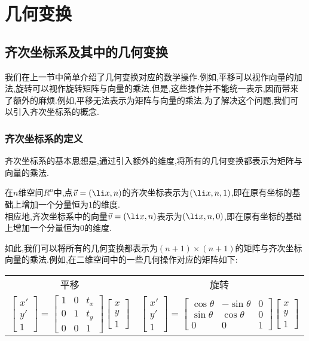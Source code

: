 \documentclass{ctexart}
\begin{document}
\section{几何变换}
\subsection{齐次坐标系及其中的几何变换}
我们在上一节中简单介绍了几何变换对应的数学操作.例如,平移可以视作向量的加法,旋转可以视作旋转矩阵与向量的乘法.但是,这些操作并不能统一表示,因而带来了额外的麻烦.例如,平移无法表示为矩阵与向量的乘法.为了解决这个问题,我们可以引入齐次坐标系的概念.
\subsubsection{齐次坐标系的定义}
\indent 齐次坐标系的基本思想是,通过引入额外的维度,将所有的几何变换都表示为矩阵与向量的乘法.
\begin{definition}[齐次坐标系]
    在$n$维空间$R^n$中,点$\vec{v}=\left(\li x,n\right)$的齐次坐标表示为$\left(\li x,n,1\right)$,即在原有坐标的基础上增加一个分量恒为$1$的维度.\\
    相应地,齐次坐标系中的向量$\vec{v}=\left(\li x,n\right)$表示为$\left(\li x,n,0\right)$,即在原有坐标的基础上增加一个分量恒为$0$的维度.
\end{definition}
如此,我们可以将所有的几何变换都表示为$(n+1)\times(n+1)$的矩阵与齐次坐标向量的乘法.例如,在二维空间中的一些几何操作对应的矩阵如下:
\begin{table}[H]\centering
    \begin{tabular}{cc}
        平移&\quad 旋转\\
        $\begin{bmatrix}
            x'\\y'\\1
        \end{bmatrix}=\begin{bmatrix}
            1&0&t_x\\0&1&t_y\\0&0&1
        \end{bmatrix}\begin{bmatrix}
            x\\y\\1
        \end{bmatrix}$&\quad$\begin{bmatrix}
            x'\\y'\\1
        \end{bmatrix}=\begin{bmatrix}
            \cos\theta&-\sin\theta&0\\\sin\theta&\cos\theta&0\\0&0&1
        \end{bmatrix}\begin{bmatrix}
            x\\y\\1
        \end{bmatrix}$
    \end{tabular}
\end{table}
\end{document}
